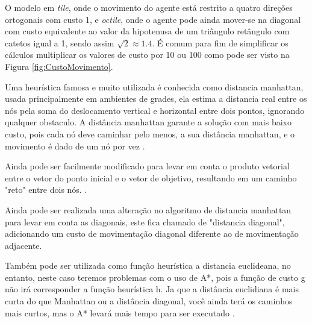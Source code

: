O modelo em \textit{tile}, onde o movimento do agente está restrito a quatro direções ortogonais com custo 1, e \textit{octile}, onde o agente pode ainda mover-se na diagonal com custo equivalente ao valor da hipotenusa de um triângulo retângulo com catetos igual a 1, sendo assim  $ \sqrt{2}  \approx 1.4 $. É comum para fim de simplificar os cálculos multiplicar os valores de custo por 10 ou 100 como pode ser visto na Figura \ref{fig:CustoMovimento}.

\begin{minipage}{\linewidth}
    \label{fig:CustoMovimento}
\end{minipage}

Uma heurística famosa e muito utilizada é conhecida como distancia manhattan, usada principalmente em ambientes de grades, ela estima a distancia real entre os nós pela soma do deslocamento vertical e horizontal entre dois pontos, ignorando qualquer obstaculo.
A distância manhattan garante a solução com mais baixo custo, pois cada nó deve caminhar pelo menos, a sua distância manhattan, e o movimento é dado de um nó por vez \cite{Korf2000}.

Ainda pode ser facilmente modificado para levar em conta o produto vetorial entre o vetor do ponto inicial e o vetor de objetivo, resultando em um caminho "reto" entre dois nós. \cite{GameProgrammingHeuristics}.

Ainda pode ser realizada uma alteração no algoritmo de distancia manhattan para levar em conta as diagonais, este fica chamado de "distancia diagonal", adicionando um custo de movimentação diagonal diferente ao de movimentação adjacente.

Também pode ser utilizada como função heurística a distancia euclideana, no entanto, neste caso teremos problemas com o uso de A*, pois a função de custo g não irá corresponder a função heurística h. Ja que a  distância euclidiana é mais curta do que Manhattan ou a distância diagonal, você ainda terá os caminhos mais curtos, mas o A* levará mais tempo para ser executado \cite{GameProgrammingHeuristics}.

